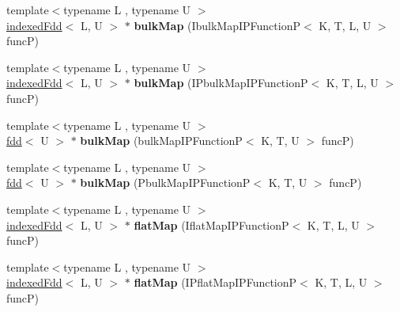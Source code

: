 \begin{DoxyCompactItemize}
\item 
\hypertarget{classfaster_1_1indexedFdd_3_01K_00_01T_01_5_01_4_a7a03d69db76df4ac10207baf44a13dd7}{}{\footnotesize template$<$typename L , typename U $>$ }\\\hyperlink{classfaster_1_1indexedFdd}{indexed\+Fdd}$<$ L, U $>$ $\ast$ {\bfseries bulk\+Map} (Ibulk\+Map\+I\+P\+Function\+P$<$ K, T, L, U $>$ func\+P)\label{classfaster_1_1indexedFdd_3_01K_00_01T_01_5_01_4_a7a03d69db76df4ac10207baf44a13dd7}

\item 
\hypertarget{classfaster_1_1indexedFdd_3_01K_00_01T_01_5_01_4_a1544d5a014659d2993ff587ca96bcc9a}{}{\footnotesize template$<$typename L , typename U $>$ }\\\hyperlink{classfaster_1_1indexedFdd}{indexed\+Fdd}$<$ L, U $>$ $\ast$ {\bfseries bulk\+Map} (I\+Pbulk\+Map\+I\+P\+Function\+P$<$ K, T, L, U $>$ func\+P)\label{classfaster_1_1indexedFdd_3_01K_00_01T_01_5_01_4_a1544d5a014659d2993ff587ca96bcc9a}

\item 
\hypertarget{classfaster_1_1indexedFdd_3_01K_00_01T_01_5_01_4_a148ae81fad5148a618eddb89fce2c349}{}{\footnotesize template$<$typename L , typename U $>$ }\\\hyperlink{classfaster_1_1fdd}{fdd}$<$ U $>$ $\ast$ {\bfseries bulk\+Map} (bulk\+Map\+I\+P\+Function\+P$<$ K, T, U $>$ func\+P)\label{classfaster_1_1indexedFdd_3_01K_00_01T_01_5_01_4_a148ae81fad5148a618eddb89fce2c349}

\item 
\hypertarget{classfaster_1_1indexedFdd_3_01K_00_01T_01_5_01_4_ac2c2942ebc4c1d6d119cccd04d1b553e}{}{\footnotesize template$<$typename L , typename U $>$ }\\\hyperlink{classfaster_1_1fdd}{fdd}$<$ U $>$ $\ast$ {\bfseries bulk\+Map} (Pbulk\+Map\+I\+P\+Function\+P$<$ K, T, U $>$ func\+P)\label{classfaster_1_1indexedFdd_3_01K_00_01T_01_5_01_4_ac2c2942ebc4c1d6d119cccd04d1b553e}

\item 
\hypertarget{classfaster_1_1indexedFdd_3_01K_00_01T_01_5_01_4_a703888ba7bbf207faa844d80fad701cc}{}{\footnotesize template$<$typename L , typename U $>$ }\\\hyperlink{classfaster_1_1indexedFdd}{indexed\+Fdd}$<$ L, U $>$ $\ast$ {\bfseries flat\+Map} (Iflat\+Map\+I\+P\+Function\+P$<$ K, T, L, U $>$ func\+P)\label{classfaster_1_1indexedFdd_3_01K_00_01T_01_5_01_4_a703888ba7bbf207faa844d80fad701cc}

\item 
\hypertarget{classfaster_1_1indexedFdd_3_01K_00_01T_01_5_01_4_a2e623a58ad9cf4ffba57db62475e1d2f}{}{\footnotesize template$<$typename L , typename U $>$ }\\\hyperlink{classfaster_1_1indexedFdd}{indexed\+Fdd}$<$ L, U $>$ $\ast$ {\bfseries flat\+Map} (I\+Pflat\+Map\+I\+P\+Function\+P$<$ K, T, L, U $>$ func\+P)\label{classfaster_1_1indexedFdd_3_01K_00_01T_01_5_01_4_a2e623a58ad9cf4ffba57db62475e1d2f}


\end{DoxyCompactItemize}
